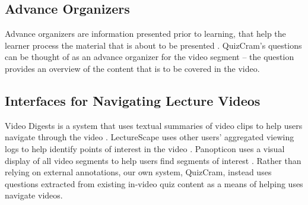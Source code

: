 \documentclass{sigchi}
\begin{document}

\subsection{Advance Organizers}

Advance organizers are information presented prior to learning, that help the learner process the material that is about to be presented  \cite{advanceorganizers}. QuizCram's questions can be thought of as an advance organizer for the video segment -- the question provides an overview of the content that is to be covered in the video. %

\subsection{Interfaces for Navigating Lecture Videos}

Video Digests is a system that uses textual summaries of video clips to help users navigate through the video \cite{videodigests}. LectureScape uses other users' aggregated viewing logs to help identify points of interest in the video \cite{lecturescape}. Panopticon uses a visual display of all video segments to help users find segments of interest \cite{panopticon}. Rather than relying on external annotations, our own system, QuizCram, instead uses questions extracted from existing in-video quiz content as a means of helping uses navigate videos. %

\end{document}
